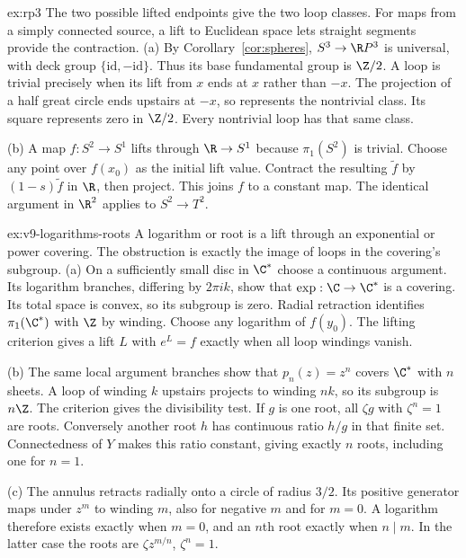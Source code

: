\begin{solution}{ex:rp3}
\idea The two possible lifted endpoints give the two loop classes. For maps from a simply connected source, a lift to Euclidean space lets straight segments provide the contraction.
\writeup (a) By Corollary~\ref{cor:spheres}, $S^3\to\R P^3$ is universal, with deck group $\{\mathrm{id},-\mathrm{id}\}$. Thus its base fundamental group is $\Z/2$. A loop is trivial precisely when its lift from $x$ ends at $x$ rather than $-x$. The projection of a half great circle ends upstairs at $-x$, so represents the nontrivial class. Its square represents zero in $\Z/2$. Every nontrivial loop has that same class.

(b) A map $f:S^2\to S^1$ lifts through $\R\to S^1$ because $\pi_1(S^2)$ is trivial. Choose any point over $f(x_0)$ as the initial lift value. Contract the resulting $\tilde f$ by $(1-s)\tilde f$ in $\R$, then project. This joins $f$ to a constant map. The identical argument in $\R^2$ applies to $S^2\to T^2$.
\end{solution}

\begin{solution}{ex:v9-logarithms-roots}
\idea A logarithm or root is a lift through an exponential or power covering. The obstruction is exactly the image of loops in the covering's subgroup.
\writeup (a) On a sufficiently small disc in $\C^*$ choose a continuous argument. Its logarithm branches, differing by $2\pi i k$, show that $\exp:\C\to\C^*$ is a covering. Its total space is convex, so its subgroup is zero. Radial retraction identifies $\pi_1(\C^*)$ with $\Z$ by winding. Choose any logarithm of $f(y_0)$. The lifting criterion gives a lift $L$ with $e^L=f$ exactly when all loop windings vanish.

(b) The same local argument branches show that $p_n(z)=z^n$ covers $\C^*$ with $n$ sheets. A loop of winding $k$ upstairs projects to winding $nk$, so its subgroup is $n\Z$. The criterion gives the divisibility test. If $g$ is one root, all $\zeta g$ with $\zeta^n=1$ are roots. Conversely another root $h$ has continuous ratio $h/g$ in that finite set. Connectedness of $Y$ makes this ratio constant, giving exactly $n$ roots, including one for $n=1$.

(c) The annulus retracts radially onto a circle of radius $3/2$. Its positive generator maps under $z^m$ to winding $m$, also for negative $m$ and for $m=0$. A logarithm therefore exists exactly when $m=0$, and an $n$th root exactly when $n\mid m$. In the latter case the roots are $\zeta z^{m/n}$, $\zeta^n=1$.
\end{solution}

